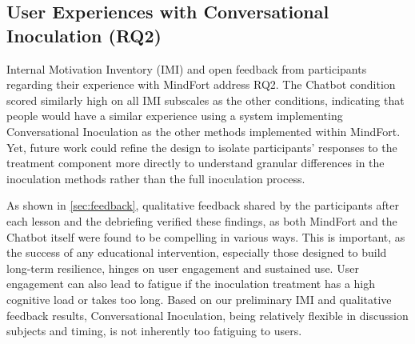 \documentclass[sigconf]{acmart}
\begin{document}
\subsection{User Experiences with Conversational Inoculation (RQ2)}

Internal Motivation Inventory (IMI) and open feedback from participants regarding their experience with MindFort address RQ2.
The Chatbot condition scored similarly high on all IMI subscales as the other conditions, indicating that people would have a similar experience using a system implementing Conversational Inoculation as the other methods implemented within MindFort.
Yet, future work could refine the design to isolate participants' responses to the treatment component more directly to understand granular differences in the inoculation methods rather than the full inoculation process.

As shown in \autoref{sec:feedback}, qualitative feedback shared by the participants after each lesson and the debriefing verified these findings, as both MindFort and the Chatbot itself were found to be compelling in various ways.
This is important, as the success of any educational intervention, especially those designed to build long-term resilience, hinges on user engagement and sustained use. 
User engagement can also lead to fatigue \cite{Tang_Sun_Nie_Li_Sergeeva_LC_2025} if the inoculation treatment has a high cognitive load or takes too long. Based on our preliminary IMI and qualitative feedback results, Conversational Inoculation, being relatively flexible in discussion subjects and timing, is not inherently too fatiguing to users.
\end{document}
